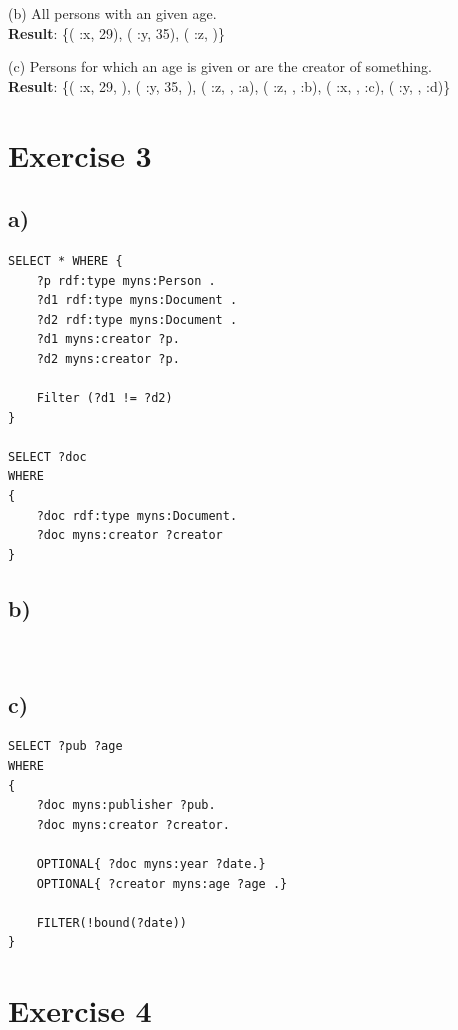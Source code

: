 \documentclass{article}
\begin{document}
(b) All persons with an given age.\\
\textbf{Result}: \{( :x, 29), ( :y, 35), ( :z, )\}\\
\vspace{0.3cm}

(c) Persons for which an age is given or are the creator of something.\\
\textbf{Result}: \{( :x, 29, ), ( :y, 35, ), ( :z, , :a), ( :z, , :b), ( :x, ,
:c), ( :y, , :d)\}
\vspace{0.3cm}

\vspace{2cm}
\section*{Exercise 3}
\subsection*{a)}
\begin{lstlisting}
SELECT * WHERE {
	?p rdf:type myns:Person .
	?d1 rdf:type myns:Document .
	?d2 rdf:type myns:Document .
	?d1 myns:creator ?p.
	?d2 myns:creator ?p.
	
	Filter (?d1 != ?d2)
}

SELECT ?doc
WHERE
{
	?doc rdf:type myns:Document.
	?doc myns:creator ?creator
}
\end{lstlisting}

\subsection*{b)}
\begin{lstlisting}


\end{lstlisting}

\subsection*{c)}
\begin{lstlisting}
SELECT ?pub ?age
WHERE
{
	?doc myns:publisher ?pub.
	?doc myns:creator ?creator.

	OPTIONAL{ ?doc myns:year ?date.}
	OPTIONAL{ ?creator myns:age ?age .}
	
	FILTER(!bound(?date))
}
\end{lstlisting}


\vspace{2cm}
\section*{Exercise 4}
\end{document}
